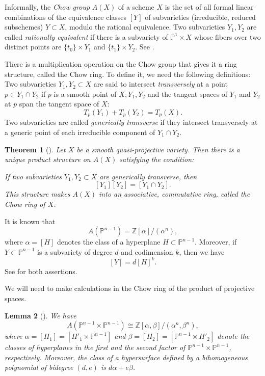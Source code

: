 \documentclass[11pt,letterpaper]{article}
\newtheorem{theorem}{Theorem}[section]
\newtheorem{lemma}[theorem]{Lemma}\AddToHook{env/lemma/begin}{\crefalias{theorem}{lemma}}
\numberwithin{equation}{section}
\newcommand{\PP}{\mathbb{P}}
\newcommand{\ZZ}{\mathbb{Z}}
\begin{document}
Informally, the \emph{Chow group} $A(X)$ of a scheme $X$ is the set of all formal linear combinations of the equivalence classes $[Y]$ of subvarieties (irreducible, reduced subschemes) $Y\subset X$, modulo the rational equivalence.
Two subvarieties $Y_1,Y_2$ are called \emph{rationally equivalent} if there is a subvariety of $\PP^{1}\times X$ whose fibers over two distinct points are $\{t_0\}\times Y_1$ and $\{t_1\}\times Y_2$.
See \cite[Definitions~1.2 and 1.3]{Eisenbud-Harris-16}.

There is a multiplication operation on the Chow group that gives it a ring structure, called the Chow ring.
To define it, we need the following definitions:
Two subvarieties $Y_1,Y_2\subset X$ are said to intersect \emph{transversely} at a point $p\in Y_1\cap Y_2$ if $p$ is a smooth point of $X,Y_1,Y_2$ and the tangent spaces of $Y_1$ and $Y_2$ at $p$ span the tangent space of $X$: \[
T_p(Y_1) + T_p(Y_2) = T_p(X).
\] Two subvarieties are called \emph{generically transverse} if they intersect transversely at a generic point of each irreducible component of $Y_1\cap Y_2$.

\begin{theorem}[{\cite[Theorem-Definition~1.5]{Eisenbud-Harris-16}}]
\label{thm:transversal-intersection}
    Let $X$ be a smooth quasi-projective variety. 
    Then there is a unique product structure on $A(X)$ satisfying the condition:

    If two subvarieties $Y_1,Y_2\subset X$ are generically transverse, then \[
    [Y_1][Y_2] = [Y_1\cap Y_2].
    \] 
    This structure makes $A(X)$ into an associative, commutative ring, called the \emph{Chow ring} of $X$.
\end{theorem}

It is known that \[
A(\PP^{n-1}) = \ZZ[\alpha]/ (\alpha^n),
\] where $\alpha=[H]$ denotes the class of a hyperplane $H\subset\PP^{n-1}$.
Moreover, if $Y\subset\PP^{n-1}$ is a subvariety of degree $d$ and codimension $k$, then we have \[
[Y] = d[H]^k.
\] See \cite[Theorem~2.1]{Eisenbud-Harris-16} for both assertions.

We will need to make calculations in the Chow ring of the product of projective spaces. 
\begin{lemma}[{\cite[Theorem~2.10]{Eisenbud-Harris-16}}]
    \label{lem:chow-ring}
    We have \[
    A(\PP^{n-1}\times\PP^{n-1})\cong \ZZ[\alpha,\beta] / (\alpha^{n},\beta^n),
    \] where $\alpha = [H_1] = [H'_1\times\PP^{n-1}]$ and $\beta=[H_2]=[\PP^{n-1}\times H'_2]$ denote the classes of hyperplanes in the first and the second factor of $\PP^{n-1}\times\PP^{n-1}$, respectively.
    Moreover, the class of a hypersurface defined by a bihomogeneous polynomial of bidegree $(d,e)$ is $d\alpha+e\beta$.
\end{lemma}
\end{document}
